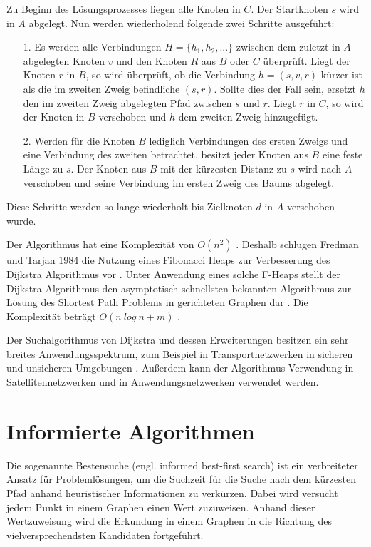 Zu Beginn des Lösungsprozesses liegen alle Knoten in $C$. Der Startknoten $s$ wird in $A$ abgelegt. Nun werden wiederholend folgende zwei Schritte ausgeführt:
\begin{itemize}
	\item[1.] Es werden alle Verbindungen $H = \{h_1, h_2, ...\}$ zwischen dem zuletzt in $A$ abgelegten Knoten $v$ und den Knoten $R$ aus $B$ oder $C$ überprüft. Liegt der Knoten $r$ in $B$, so wird überprüft, ob die Verbindung $h = \left(s, v, r\right)$ kürzer ist als die im zweiten Zweig befindliche $\left(s, r\right)$. Sollte dies der Fall sein, ersetzt $h$ den im zweiten Zweig abgelegten Pfad zwischen $s$ und $r$. Liegt $r$ in $C$, so wird der Knoten in $B$ verschoben und $h$ dem zweiten Zweig hinzugefügt.
	\item[2.] Werden für die Knoten $B$ lediglich Verbindungen des ersten Zweigs und eine Verbindung des zweiten betrachtet, besitzt jeder Knoten aus $B$ eine feste Länge zu $s$. Der Knoten aus $B$ mit der kürzesten Distanz zu $s$ wird nach $A$ verschoben und seine Verbindung im ersten Zweig des Baums abgelegt.
\end{itemize}
Diese Schritte werden so lange wiederholt bis Zielknoten $d$ in $A$ verschoben wurde.

Der Algorithmus hat eine Komplexität von $O(n^2)$ \cite[S.5]{Madkour.2017}. Deshalb schlugen Fredman und Tarjan 1984 die Nutzung eines Fibonacci Heaps zur Verbesserung des Dijkstra Algorithmus vor \cite{Fredman.1987}. Unter Anwendung eines solche F-Heaps stellt der Dijkstra Algorithmus den asymptotisch schnellsten bekannten Algorithmus zur Lösung des Shortest Path Problems in gerichteten Graphen dar \cite{Schmitz.2019}.  Die Komplexität beträgt $O(n\ log\ n + m)$ \cite[S.5]{Madkour.2017}. %

Der Suchalgorithmus von Dijkstra und dessen Erweiterungen besitzen ein sehr breites Anwendungsspektrum, zum Beispiel in Transportnetzwerken in sicheren \cite{BAN17} und unsicheren Umgebungen \cite{DCZM12}. Außerdem kann der Algorithmus Verwendung in Satellitennetzwerken \cite{HH15} und in Anwendungsnetzwerken \cite{JYA14} verwendet werden.

\section{Informierte Algorithmen}

Die sogenannte Bestensuche (engl. informed best-first search)
ist ein verbreiteter Ansatz für Problemlösungen, um die Suchzeit für die Suche nach dem kürzesten Pfad
anhand heuristischer Informationen zu verkürzen. Dabei wird versucht jedem Punkt in einem Graphen einen Wert zuzuweisen. Anhand dieser Wertzuweisung wird die Erkundung in einem Graphen in die Richtung des vielversprechendsten Kandidaten fortgeführt\cite{RinaDechterandJudeaPearl.1983}.

